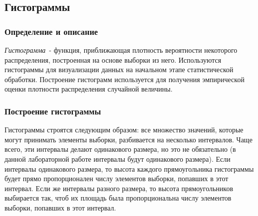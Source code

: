 \subsection{Гистограммы}

\subsubsection{Определение и описание}
\textit{Гистограмма}\ - функция, приближающая плотность вероятности некоторого распределения, построенная на основе выборки из него. Используются гистограммы для визуализации данных на начальном этапе статистической обработки. Построение гистограмм используется для получения эмпирической оценки плотности распределения случайной величины.

\subsubsection{Построение гистограммы}
Гистограммы строятся следующим образом: все множество значений, которые могут принимать элементы выборки, разбивается на несколько интервалов. Чаще всего, эти интервалы делают одинакового размера, но это не обязательно (в данной лабораторной работе интервалы будут одинакового размера). Если интервалы одинакового размера, то высота каждого прямоугольника гистограммы будет прямо пропорционален числу элементов выборки, попавших в этот интервал. Если же интервалы разного размера, то высота прямоугольников выбирается так, чтоб их площадь была пропорциональна числу элементов выборки, попавших в этот интервал.
